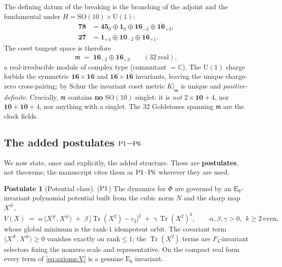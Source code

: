 \documentclass[11pt]{article}
\theoremstyle{plain}
\theoremstyle{definition}
\newtheorem{postulate}[theorem]{Postulate}
\theoremstyle{remark}
\newcommand{\SO}[1]{\mathrm{SO}(#1)}
\newcommand{\U}[1]{\mathrm{U}(#1)}
\newcommand{\E}[1]{\mathrm{E}_{#1}}
\newcommand{\Tr}{\operatorname{Tr}}
\newcommand{\SOTen}{\SO{10}}
\newcommand{\UOne}{\U{1}}
\newcommand{\ESix}{\E{6}}
\newcommand{\Rep}[1]{\mathbf{#1}}
\newcommand{\Repbar}[1]{\overline{\mathbf{#1}}}
\newcommand{\Pone}{\textnormal{P1}}
\newcommand{\Psix}{\textnormal{P6}}
\begin{document}
The defining datum of the breaking is the branching of the adjoint and the
fundamental under $H=\SOTen\times\UOne$:
\begin{align}
  \Rep{78} &= \Rep{45}_{0}\oplus\Rep{1}_{0}
              \oplus\Rep{16}_{-3}\oplus\Repbar{16}_{+3}, \label{eq:axioms:adj}\\
  \Rep{27} &= \Rep{1}_{+4}\oplus\Rep{10}_{-2}\oplus\Rep{16}_{+1}.
              \label{eq:axioms:fund}
\end{align}
The coset tangent space is therefore
\begin{equation}\label{eq:axioms:tangent}
  \mathfrak m \;=\; \Rep{16}_{-3}\oplus\Repbar{16}_{+3}
  \qquad (32\ \text{real}),
\end{equation}
a real-irreducible module of complex type (commutant $=\mathbb C$). The
$\UOne$ charge forbids the symmetric $\Rep{16}\times\Rep{16}$ and
$\Repbar{16}\times\Repbar{16}$ invariants, leaving the unique charge-zero
cross-pairing; by Schur the invariant coset metric $K|_{\mathfrak m}$ is
unique and \emph{positive-definite}. Crucially, $\mathfrak m$ contains
\textbf{no} $\SOTen$ singlet: it is \emph{not} $2\times\Rep{10}+4$, nor
$\Rep{10}+\Repbar{10}+4$, nor anything with a singlet. The $32$ Goldstones
spanning $\mathfrak m$ are the clock fields.

\subsection{The added postulates \texorpdfstring{$\Pone$--$\Psix$}{P1--P6}}
\label{sec:axioms:postulates}

We now state, once and explicitly, the added structure. These are
\textbf{postulates}, not theorems; the manuscript cites them as
$\Pone$--$\Psix$ wherever they are used.

\begin{postulate}[Potential class]\label{post:axioms:P1}
($\Pone$) The dynamics for $\Phi$ are governed by an $\ESix$-invariant
polynomial potential built from the cubic norm $N$ and the sharp map
$X^{\#}$,
\begin{equation}\label{eq:axioms:V}
  V(X)\;=\;\alpha\,\langle X^{\#},X^{\#}\rangle
          \;+\;\beta\,\bigl[\Tr(X^2)-c_2\bigr]^2
          \;+\;\gamma\,\Tr(X^2)^{k},
  \qquad \alpha,\beta,\gamma>0,\ \ k\ge2\ \text{even},
\end{equation}
whose global minimum is the rank-$1$ idempotent orbit. The covariant term
$\langle X^{\#},X^{\#}\rangle\ge0$ vanishes exactly on $\mathrm{rank}\le1$;
the $\Tr(X^2)$ terms are $F_4$-invariant selectors fixing the nonzero scale
and representative. On the compact real form every term of
\eqref{eq:axioms:V} is a genuine $\ESix$ invariant.
\end{postulate}
\end{document}

